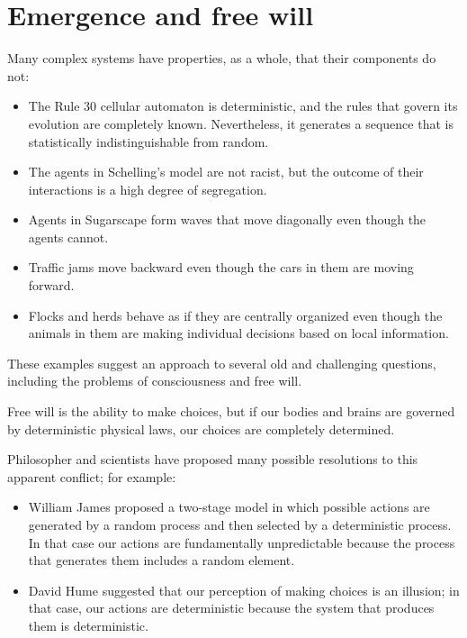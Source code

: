 \documentclass[12pt]{book}
\theoremstyle{exercise}
\begin{document}
\section{Emergence and free will}
\label{freewill}

Many complex systems have properties, as a whole, that their components do not:

\begin{itemize}

\item The Rule 30 cellular automaton is deterministic, and the rules
  that govern its evolution are completely known.  Nevertheless, it
  generates a sequence that is statistically indistinguishable from
  random.

\item The agents in Schelling's model are not racist, but the outcome
  of their interactions is a high degree of segregation.

\item Agents in Sugarscape form waves that move diagonally even
  though the agents cannot.

\item Traffic jams move backward even though the cars in them are
  moving forward.

\item Flocks and herds behave as if they are centrally organized even though the animals in them are making individual decisions based on local information.

\end{itemize}

These examples suggest an approach to several old and challenging questions, including the problems of consciousness and free will.


Free will is the ability to make choices, but if our bodies and brains
are governed by deterministic physical laws, our choices are completely determined.  

Philosopher and scientists have proposed many possible resolutions to this apparent conflict; for example:

\begin{itemize}

\item William James proposed a two-stage model in which
  possible actions are generated by a random process and then selected
  by a deterministic process.  In that case our actions are
  fundamentally unpredictable because the process that generates them
  includes a random element.

\item David Hume suggested that our perception of making choices
  is an illusion; in that case, our actions are deterministic because
  the system that produces them is deterministic.

\end{itemize}
\end{document}
